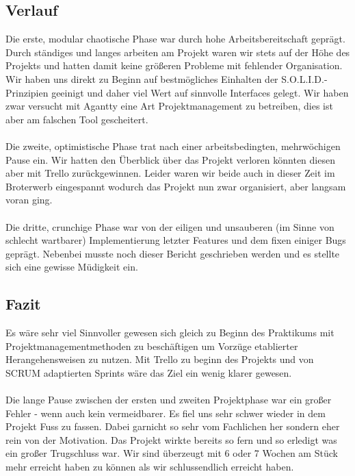 \subsection{Verlauf}
Die erste, \glqq modular chaotische\grqq{} Phase war durch hohe Arbeitsbereitschaft geprägt. Durch ständiges und langes arbeiten am Projekt waren wir stets auf der Höhe des Projekts und hatten damit keine größeren Probleme mit fehlender Organisation. Wir haben uns direkt zu Beginn auf bestmögliches Einhalten der S.O.L.I.D.-Prinzipien geeinigt und daher viel Wert auf sinnvolle Interfaces gelegt. Wir haben zwar versucht mit Agantty eine Art Projektmanagement zu betreiben, dies ist aber am falschen Tool gescheitert.\\\\
Die zweite, \glqq optimistische\grqq{} Phase trat nach einer arbeitsbedingten, mehrwöchigen Pause ein. Wir hatten den Überblick über das Projekt verloren könnten diesen aber mit Trello zurückgewinnen. Leider waren wir beide auch in dieser Zeit im Broterwerb eingespannt wodurch das Projekt nun zwar organisiert, aber langsam voran ging.\\\\
Die dritte, \glqq crunchige\grqq{} Phase war von der eiligen und unsauberen (im Sinne von \glqq schlecht wartbarer\grqq{}) Implementierung letzter Features und dem fixen einiger Bugs geprägt. Nebenbei musste noch dieser Bericht geschrieben werden und es stellte sich eine gewisse Müdigkeit ein.

\subsection{Fazit}
Es wäre sehr viel Sinnvoller gewesen sich gleich zu Beginn des Praktikums mit Projektmanagementmethoden zu beschäftigen um Vorzüge etablierter Herangehensweisen zu nutzen. Mit Trello zu beginn des Projekts und von SCRUM adaptierten Sprints wäre das Ziel ein wenig klarer gewesen.\\\\Die lange Pause zwischen der ersten und zweiten Projektphase war ein großer Fehler - wenn auch kein vermeidbarer. Es fiel uns sehr schwer wieder in dem Projekt Fuss zu fassen. Dabei garnicht so sehr vom Fachlichen her sondern eher rein von der Motivation. Das Projekt wirkte bereits so fern und so erledigt was ein großer Trugschluss war. Wir sind überzeugt mit 6 oder 7 Wochen am Stück mehr erreicht haben zu können als wir schlussendlich erreicht haben.

